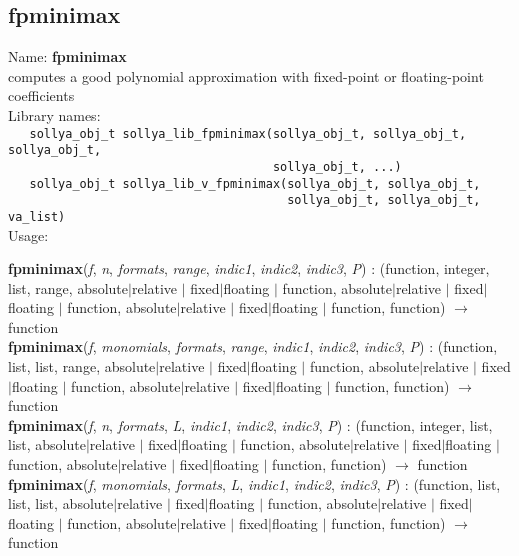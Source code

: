 \subsection{fpminimax}
\label{labfpminimax}
\noindent Name: \textbf{fpminimax}\\
\phantom{aaa}computes a good polynomial approximation with fixed-point or floating-point coefficients\\[0.2cm]
\noindent Library names:\\
\verb|   sollya_obj_t sollya_lib_fpminimax(sollya_obj_t, sollya_obj_t, sollya_obj_t,|\\
\verb|                                     sollya_obj_t, ...)|\\
\verb|   sollya_obj_t sollya_lib_v_fpminimax(sollya_obj_t, sollya_obj_t,|\\
\verb|                                       sollya_obj_t, sollya_obj_t, va_list)|\\[0.2cm]
\noindent Usage: 
\begin{center}
\textbf{fpminimax}(\emph{f}, \emph{n}, \emph{formats}, \emph{range}, \emph{indic1}, \emph{indic2}, \emph{indic3}, \emph{P}) : (\textsf{function}, \textsf{integer}, \textsf{list}, \textsf{range}, \textsf{absolute$|$relative} $|$ \textsf{fixed$|$floating} $|$ \textsf{function}, \textsf{absolute$|$relative} $|$ \textsf{fixed$|$floating} $|$ \textsf{function}, \textsf{absolute$|$relative} $|$ \textsf{fixed$|$floating} $|$ \textsf{function}, \textsf{function}) $\rightarrow$ \textsf{function}\\
\textbf{fpminimax}(\emph{f}, \emph{monomials}, \emph{formats}, \emph{range}, \emph{indic1}, \emph{indic2}, \emph{indic3}, \emph{P}) : (\textsf{function}, \textsf{list}, \textsf{list}, \textsf{range},  \textsf{absolute$|$relative} $|$ \textsf{fixed$|$floating} $|$ \textsf{function}, \textsf{absolute$|$relative} $|$ \textsf{fixed$|$floating} $|$ \textsf{function}, \textsf{absolute$|$relative} $|$ \textsf{fixed$|$floating} $|$ \textsf{function}, \textsf{function}) $\rightarrow$ \textsf{function}\\
\textbf{fpminimax}(\emph{f}, \emph{n}, \emph{formats}, \emph{L}, \emph{indic1}, \emph{indic2}, \emph{indic3}, \emph{P}) : (\textsf{function}, \textsf{integer}, \textsf{list}, \textsf{list},  \textsf{absolute$|$relative} $|$ \textsf{fixed$|$floating} $|$ \textsf{function}, \textsf{absolute$|$relative} $|$ \textsf{fixed$|$floating} $|$ \textsf{function}, \textsf{absolute$|$relative} $|$ \textsf{fixed$|$floating} $|$ \textsf{function}, \textsf{function}) $\rightarrow$ \textsf{function}\\
\textbf{fpminimax}(\emph{f}, \emph{monomials}, \emph{formats}, \emph{L}, \emph{indic1}, \emph{indic2}, \emph{indic3}, \emph{P}) : (\textsf{function}, \textsf{list}, \textsf{list}, \textsf{list},  \textsf{absolute$|$relative} $|$ \textsf{fixed$|$floating} $|$ \textsf{function}, \textsf{absolute$|$relative} $|$ \textsf{fixed$|$floating} $|$ \textsf{function}, \textsf{absolute$|$relative} $|$ \textsf{fixed$|$floating} $|$ \textsf{function}, \textsf{function}) $\rightarrow$ \textsf{function}\\
\end{center}
